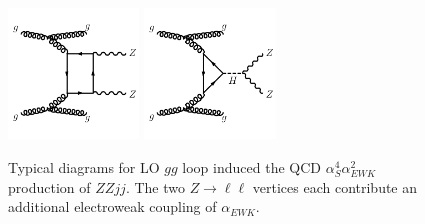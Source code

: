 \begin{figure}[!htbp]
  \begin{center}
  \includegraphics[width=0.31\textwidth]{figures/Theory/diagramQCDZZjjbox.pdf}
  \includegraphics[width=0.31\textwidth]{figures/Theory/diagramQCDZZjjggH.pdf}\\
  \end{center}
  \caption{Typical diagrams for LO $gg$ loop induced the QCD $\alpha_{S}^4\alpha_{EWK}^{2}$ production of $ZZjj$. The two $Z\rightarrow \ell \ell$ vertices each contribute an additional electroweak coupling of $\alpha_{EWK}$. \label{fig:ZZjjFeynmanDiag_QCD_gg}}
 \end{figure}
 
